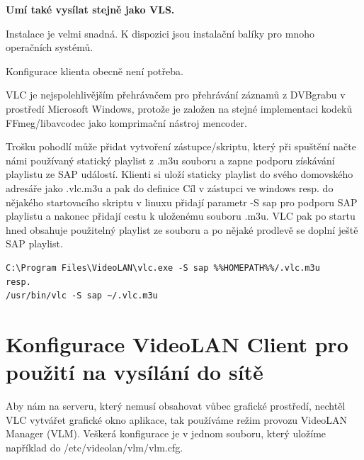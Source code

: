 \vspace{10pt}

\textbf{Umí také vysílat stejně jako VLS.}

\vspace{10pt}

Instalace je velmi snadná. K dispozici jsou instalační balíky pro mnoho operačních systémů.

\vspace{10pt}

Konfigurace klienta obecně není potřeba. 

\vspace{10pt}

VLC je nejspolehlivějším přehrávačem pro přehrávání záznamů z DVBgrabu v prostředí Microsoft Windows, protože je založen na stejné implementaci kodeků FFmeg/libavcodec jako komprimační nástroj mencoder.

Trošku pohodlí může přidat vytvoření zástupce/skriptu, který při spuštění načte námi používaný statický playlist z .m3u souboru a zapne podporu získávání playlistu ze SAP událostí. Klienti si uloží staticky playlist do svého domovského adresáře jako .vlc.m3u a pak do definice Cíl v zástupci ve windows resp. do nějakého startovacího skriptu v linuxu přidají parametr -S sap pro podporu SAP playlistu a nakonec přidají cestu k uloženému souboru .m3u. VLC pak po startu hned obsahuje použitelný playlist ze souboru a po nějaké prodlevě se doplní ještě SAP playlist.

\vspace{10pt}

\begin{small}
\begin{verbatim}
C:\Program Files\VideoLAN\vlc.exe -S sap %%HOMEPATH%%/.vlc.m3u
resp.
/usr/bin/vlc -S sap ~/.vlc.m3u
\end{verbatim}
\end{small}

\vspace{10pt}

\section{Konfigurace VideoLAN Client pro použití na vysílání do sítě}

\vspace{10pt}

Aby nám na serveru, který nemusí obsahovat vůbec grafické prostředí, nechtěl VLC vytvářet grafické okno aplikace, tak používáme režim provozu VideoLAN Manager (VLM). Veškerá konfigurace je v jednom souboru, který uložíme například do /etc/videolan/vlm/vlm.cfg.


